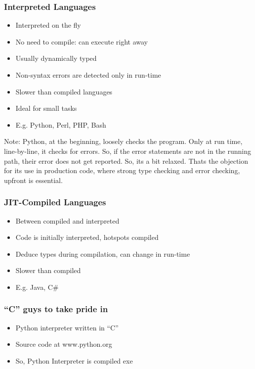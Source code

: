 \begin{frame}[fragile]  \frametitle{Interpreted Languages}
\begin{itemize}
\item  Interpreted on the fly
\item No need to compile: can execute right away
\item Usually dynamically typed
\item Non-syntax errors are detected only in run-time
\item Slower than compiled languages
\item Ideal for small tasks
\item  E.g. Python, Perl, PHP, Bash
\end{itemize}

Note: Python, at the beginning, loosely checks the program. Only at run time, line-by-line, it checks for errors. So, if the error statements are not in the running path, their error does not get reported. So, its a bit relaxed. Thats the objection for its use in production code, where strong type checking and error checking, upfront is essential.
\end{frame}

\begin{frame}[fragile]  \frametitle{JIT-Compiled Languages}
\begin{itemize}
\item Between compiled and interpreted
\item Code is initially interpreted, hotspots compiled
\item Deduce types during compilation, can change in run-time
\item Slower than compiled
\item E.g. Java, C\#
\end{itemize}
\end{frame}

\begin{frame}[fragile]  \frametitle{``C'' guys to take pride in}
\begin{itemize}
\item Python interpreter written in  ``C''
\item Source code at www.python.org
\item So, Python Interpreter is compiled exe
\end{itemize}
\end{frame}


